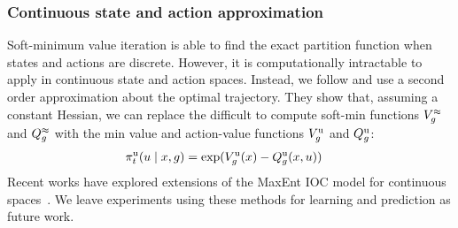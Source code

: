 \subsubsection{Continuous state and action approximation}
Soft-minimum value iteration is able to find the exact partition function when states and actions are discrete. However, it is computationally intractable to apply in continuous state and action spaces. Instead, we follow \citet{dragan_2013_assistive} and use a second order approximation about the optimal trajectory. They show that, assuming a constant Hessian, we can replace the difficult to compute soft-min functions $V^{\approx}_g$ and $Q^{\approx}_g$ with the min value and action-value functions $V_{g}^{\text{u}}$ and $Q_{g}^{\text{u}}$:
\begin{align*}
  \pi^{\text{u}}_t(u \mid x, g) &= \exp(V_{g}^{\text{u}}(x) -Q_{g}^{\text{u}}(x, u))
\end{align*}
Recent works have explored extensions of the MaxEnt IOC model for continuous spaces~\citep{boularias_2011, levine_2012, finn_2016}. We leave experiments using these methods for learning and prediction as future work.

